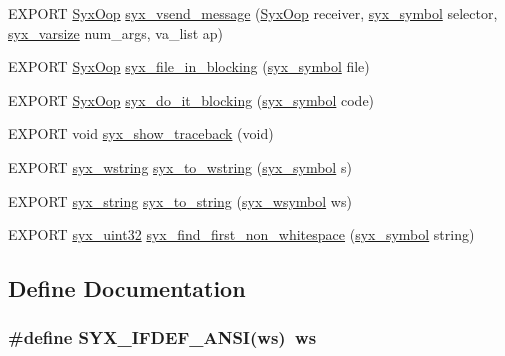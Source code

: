 \begin{CompactItemize}
\item 
EXPORT \hyperlink{syx-types_8h_1121caba2d40b2ce090b640762744ccd}{SyxOop} \hyperlink{syx-utils_8h_cea22d4450dbe695ee66ed7d1211666d}{syx\_\-vsend\_\-message} (\hyperlink{syx-types_8h_1121caba2d40b2ce090b640762744ccd}{SyxOop} receiver, \hyperlink{syx-types_8h_9663af54b7b72f5d8be5f754ef356525}{syx\_\-symbol} selector, \hyperlink{syx-types_8h_18e1a1417591a1efb670b97ce320f535}{syx\_\-varsize} num\_\-args, va\_\-list ap)
\item 
EXPORT \hyperlink{syx-types_8h_1121caba2d40b2ce090b640762744ccd}{SyxOop} \hyperlink{syx-utils_8h_fa9f19b7a2fc29dc3b06a5d21e894040}{syx\_\-file\_\-in\_\-blocking} (\hyperlink{syx-types_8h_9663af54b7b72f5d8be5f754ef356525}{syx\_\-symbol} file)
\item 
EXPORT \hyperlink{syx-types_8h_1121caba2d40b2ce090b640762744ccd}{SyxOop} \hyperlink{syx-utils_8h_c6b5dd77f43dc814af8ac022d9cd81d7}{syx\_\-do\_\-it\_\-blocking} (\hyperlink{syx-types_8h_9663af54b7b72f5d8be5f754ef356525}{syx\_\-symbol} code)
\item 
EXPORT void \hyperlink{syx-utils_8h_82cfea58c47c3a90582124eb1f9c3b4b}{syx\_\-show\_\-traceback} (void)
\item 
EXPORT \hyperlink{syx-types_8h_049e6bf08a24efd298a398b5e8c27ead}{syx\_\-wstring} \hyperlink{syx-utils_8h_2d9ceb54c05ac4eb22988697388a1409}{syx\_\-to\_\-wstring} (\hyperlink{syx-types_8h_9663af54b7b72f5d8be5f754ef356525}{syx\_\-symbol} s)
\item 
EXPORT \hyperlink{syx-types_8h_1bff1fd86072dd98849437bc9dcb35c3}{syx\_\-string} \hyperlink{syx-utils_8h_c90ca4dadc5e5807bf91d19cbf96c6a6}{syx\_\-to\_\-string} (\hyperlink{syx-types_8h_6fab7c0dab70ca1ee8812c0b5a6e0819}{syx\_\-wsymbol} ws)
\item 
EXPORT \hyperlink{syx-types_8h_eb2d8221bf07737360750e4c0ec66a99}{syx\_\-uint32} \hyperlink{syx-utils_8h_c13460f83b6da41da4c7181730fe5673}{syx\_\-find\_\-first\_\-non\_\-whitespace} (\hyperlink{syx-types_8h_9663af54b7b72f5d8be5f754ef356525}{syx\_\-symbol} string)
\end{CompactItemize}


\subsection{Define Documentation}
\hypertarget{syx-utils_8h_f825cdcdcf8c4abef4ffd0877aa201c5}{
\subsubsection{\setlength{\rightskip}{0pt plus 5cm}\#define SYX\_\-IFDEF\_\-ANSI(ws)~ws}}
\label{syx-utils_8h_f825cdcdcf8c4abef4ffd0877aa201c5}


